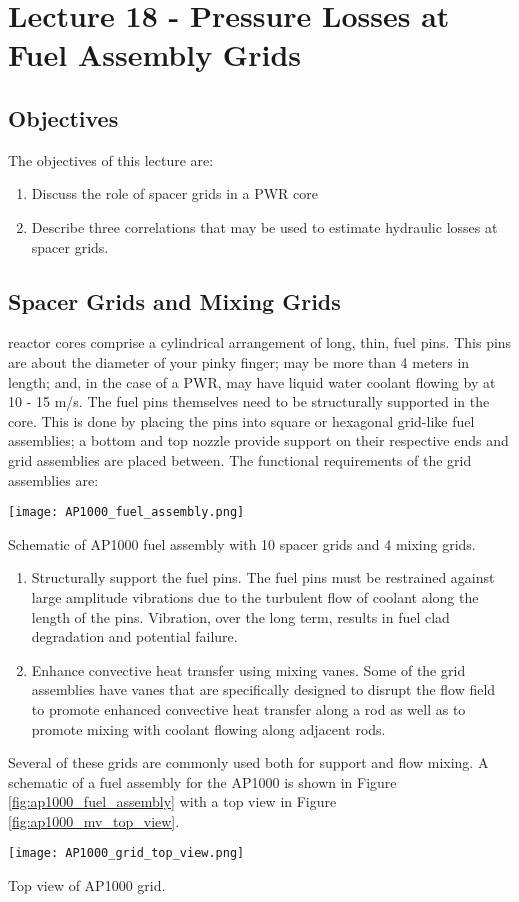 \chapter{Lecture 18 - Pressure Losses at Fuel Assembly Grids}
\label{ch:ch18}
\section{Objectives}
The objectives of this lecture are:
\begin{enumerate}
\item Discuss the role of spacer grids in a PWR core
\item Describe three correlations that may be used to estimate hydraulic losses at spacer grids.
\end{enumerate}

\section{Spacer Grids and Mixing Grids}
 
 reactor cores comprise a cylindrical arrangement of long, thin, fuel pins.  This pins are about the diameter of your pinky finger; may be more than 4 meters in length; and, in the case of a PWR, may have liquid water coolant flowing by at 10 - 15 m/s.  The fuel pins themselves need to be structurally supported in the core.  This is done by placing the pins into square or hexagonal grid-like fuel assemblies; a bottom and top nozzle provide support on their respective ends and grid assemblies are placed between.  The functional requirements of the grid assemblies are:
\begin{marginfigure}
\texttt{[image: AP1000\_fuel\_assembly.png]}
\caption{Schematic of AP1000 fuel assembly with 10 spacer grids and 4 mixing grids.}
\label{fig:ap1000_fuel_assembly}
\end{marginfigure}
\begin{enumerate}
\item Structurally support the fuel pins.  The fuel pins must be restrained against large amplitude vibrations due to the turbulent flow of coolant along the length of the pins.  Vibration, over the long term, results in fuel clad degradation and potential failure.  

\item Enhance convective heat transfer using mixing vanes.  Some of the grid assemblies have vanes that are specifically designed to disrupt the flow field to promote enhanced convective heat transfer along a rod as well as to promote mixing with coolant flowing along adjacent rods.  

\end{enumerate}   
Several of these grids are commonly used both for support and flow mixing.  A schematic of a fuel assembly for the AP1000 is shown in Figure \ref{fig:ap1000_fuel_assembly} with a top view in Figure \ref{fig:ap1000_mv_top_view}.
\begin{marginfigure}
\texttt{[image: AP1000\_grid\_top\_view.png]}
\caption{Top view of AP1000 grid.}
\label{fig:ap1000_mv_top_view}
\end{marginfigure}


